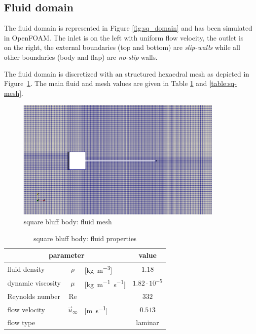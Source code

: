 \subsection{Fluid domain}

The fluid domain is represented in Figure \ref{fig:sq_domain} and has been simulated in OpenFOAM. The inlet is on the left with uniform flow velocity, the outlet is on the right, the external boundaries (top and bottom) are \textit{slip-walls} while all other boundaries (body and flap) are \textit{no-slip} walls.


The fluid domain is discretized with an structured hexaedral mesh as depicted in Figure~\ref{fig:sq_mesh}. The main fluid and mesh values are given in Table \ref{table:sq-fluid} and \ref{table:sq-mesh}. 

\begin{figure}[htbp!]
	\centering
	\includegraphics[width=0.9\textwidth]{images/sq-cyl/sq_mesh.png}
	\caption{square bluff body: fluid mesh}
	\label{fig:sq_mesh}
\end{figure}


\begin{table}[!htb]
	\begin{center}
		\begin{tabular}{ l c l | c } 
			\multicolumn{3}{c|}{parameter} & value  \\ 
			\hline
			fluid density  & $\rho$ & [\si{kg.m^{-3}}] & $1.18$   \\
			dynamic viscosity & $\mu$& [\si{kg.m^{-1}.s^{-1}}] & $1.82 \cdot 10^{-5}$  \\
			Reynolds number & Re &  & $332$ \\
			flow velocity & $\vec{u}_{\infty}$ & [\si{m.s^{-1}}] & $0.513$ \\
			flow type & & & laminar \\
		\end{tabular}
	\end{center}
	\caption{square bluff body: fluid properties}
	\label{table:sq-fluid}
\end{table}



